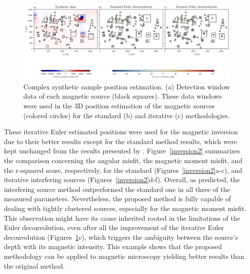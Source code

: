 \begin{figure}[tb!]
  \centering
  \includegraphics[width=1\linewidth]{paper/figures/euler-comparion-2.png}
  \caption{Complex synthetic sample position estimation. (a) Detection window data of each magnetic source (black squares). These data windows were used in the 3D position estimation of the magnetic sources (colored circles) for the standard (b) and iterative (c) methodologies. }
  \label{euler2}
\end{figure}

These iterative Euler estimated positions were used for the magnetic inversion due to their better results except for the standard method results, which were kept unchanged from the results presented by \citet{Souza-Junior2023b}. Figure~\ref{inversion2} summarizes the comparison concerning the angular misfit, the magnetic moment misfit, and the r-squared score, respectively, for the standard (Figures~\ref{inversion2}a-c), and iterative interfering sources (Figures~\ref{inversion2}d-f). Overall, as predicted, the interfering source method outperformed the standard one in all three of the measured parameters. Nevertheless, the proposed method is fully capable of dealing with tightly clustered sources, especially for the magnetic moment misfit. This observation might have its cause inherited rooted in the limitations of the Euler deconvolution, even after all the improvement of the iterative Euler deconvolution (Figures~\ref{euler2}c), which triggers the ambiguity between the source's depth with its magnetic intensity. This example shows that the proposed methodology can be applied to magnetic microscopy yielding better results than the original method.


